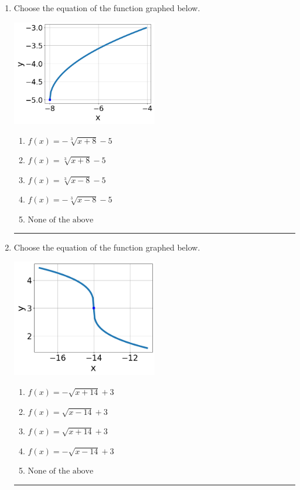 \documentclass[14pt]{extbook}
\newcommand{\litem}[1]{\item#1\hspace*{-1cm}\rule{\textwidth}{0.4pt}}
\begin{document}
\begin{enumerate}
\litem{
Choose the equation of the function graphed below.
\begin{center}
    \includegraphics[width=0.5\textwidth]{../Figures/radicalGraphToEquationCopyB.png}
\end{center}
\begin{enumerate}[label=\Alph*.]
\item \( f(x) = - \sqrt[3]{x + 8} - 5 \)
\item \( f(x) = \sqrt[3]{x + 8} - 5 \)
\item \( f(x) = \sqrt[3]{x - 8} - 5 \)
\item \( f(x) = - \sqrt[3]{x - 8} - 5 \)
\item \( \text{None of the above} \)

\end{enumerate} }
\litem{
Choose the equation of the function graphed below.
\begin{center}
    \includegraphics[width=0.5\textwidth]{../Figures/radicalGraphToEquationB.png}
\end{center}
\begin{enumerate}[label=\Alph*.]
\item \( f(x) = - \sqrt{x + 14} + 3 \)
\item \( f(x) = \sqrt{x - 14} + 3 \)
\item \( f(x) = \sqrt{x + 14} + 3 \)
\item \( f(x) = - \sqrt{x - 14} + 3 \)
\item \( \text{None of the above} \)


\end{enumerate}}
\end{enumerate}
\end{document}
